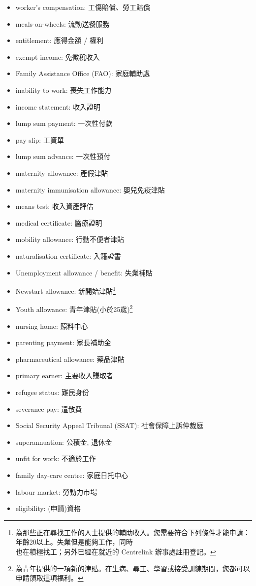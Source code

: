 \begin{multicols}{2}
\begin{itemize}
  \item worker's compensation: 工傷賠償、勞工賠償
  \item meals-on-wheels: 流動送餐服務
  \item entitlement: 應得金額 / 權利
  \item exempt income: 免徵稅收入
  \item Family Assistance Office (FAO): 家庭輔助處
  \item inability to work: 喪失工作能力
  \item income statement: 收入證明
  \item lump sum payment: 一次性付款
  \item pay slip: 工資單
  \item lump sum advance: 一次性預付
  \item maternity allowance: 產假津貼
  \item maternity immunisation allowance: 嬰兒免疫津貼
  \item means test: 收入資產評估
  \item medical certificate: 醫療證明
  \item mobility allowance: 行動不便者津貼
  \item naturalisation certificate: 入籍證書
  \item Unemployment allowance / benefit: 失業補貼
  \item Newstart allowance: 新開始津貼\footnote{為那些正在尋找工作的人士提供的輔助收入。您需要符合下列條件才能申請：年齡20以上。失業但是能夠工作，同時\\也在積極找工；另外已經在就近的 Centrelink 辦事處註冊登記。}
  \item Youth allowance: 青年津貼(小於25歲)\footnote{為青年提供的一項新的津貼。在生病、尋工、學習或接受訓練期間，您都可以申請領取這項福利。}
  \item nursing home: 照料中心
  \item parenting payment: 家長補助金
  \item pharmaceutical allowance: 藥品津貼
  \item primary earner: 主要收入賺取者
  \item refugee status: 難民身份
  \item severance pay: 遣散費
  \item Social Security Appeal Tribunal (SSAT): 社會保障上訴仲裁庭
  \item superannuation: 公積金, 退休金
  \item unfit for work: 不適於工作
  \item family day-care centre: 家庭日托中心
  \item labour market: 勞動力市場
  \item eligibility: (申請)資格
\end{itemize}
\end{multicols}